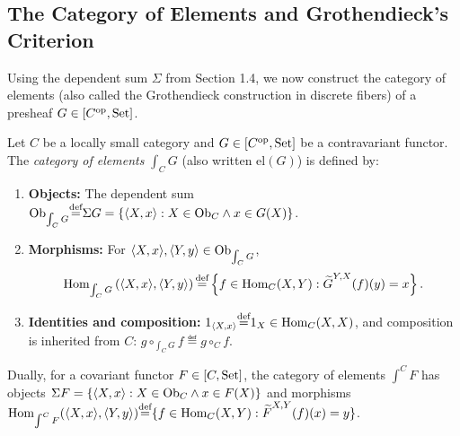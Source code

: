 \documentclass[10pt,a4paper]{article}
\begin{document}
\subsection{The Category of Elements and Grothendieck's Criterion}
Using the dependent sum $\Sigma$ from Section 1.4, we now construct the category of elements (also called the Grothendieck construction in discrete fibers) of a presheaf $G \in [C^{\textrm{op}}, {\textrm{Set}}]$.

\begin{definition}\label{def:cat_of_elements}
Let $C$ be a locally small category and $G \in [C^{\textrm{op}}, {\textrm{Set}}]$ be a contravariant functor. The \emph{category of elements} $\int_C G$ (also written $\mathrm{el}(G)$) is defined by:
\begin{enumerate}
\item \textbf{Objects:} The dependent sum ${\textrm{Ob}}_{\int_C G} {\stackrel{{\textrm{def}}}{=}} \Sigma G = \{\langle X, x \rangle : X \in {\textrm{Ob}}_C \land x \in G(X)\}$.
\item \textbf{Morphisms:} For $\langle X, x \rangle, \langle Y, y \rangle \in {\textrm{Ob}}_{\int_C G}$,
$${\textrm{Hom}}_{\int_C G}\left(\langle X, x \rangle, \langle Y, y \rangle\right) {\stackrel{{\textrm{def}}}{=}} \left\{ f \in {\textrm{Hom}}_C(X, Y) : {\widetilde{G}\textrm{}}^{Y,X}(f)(y) = x \right\}.$$
\item \textbf{Identities and composition:} $1_{\langle X, x \rangle} {\stackrel{{\textrm{def}}}{=}} 1_X \in {\textrm{Hom}}_C(X,X)$, and composition is inherited from $C$: $g \circ_{\int_C G} f \eqdef g \circ_C f$.
\end{enumerate}
Dually, for a covariant functor $F \in [C, {\textrm{Set}}]$, the category of elements $\int^C F$ has objects $\Sigma F = \{\langle X, x \rangle : X \in {\textrm{Ob}}_C \land x \in F(X)\}$ and morphisms ${\textrm{Hom}}_{\int^C F}(\langle X, x \rangle, \langle Y, y \rangle) {\stackrel{{\textrm{def}}}{=}} \{f \in {\textrm{Hom}}_C(X, Y) : {\widetilde{F}\textrm{}}^{X,Y}(f)(x) = y\}$.
\end{definition}
\end{document}
